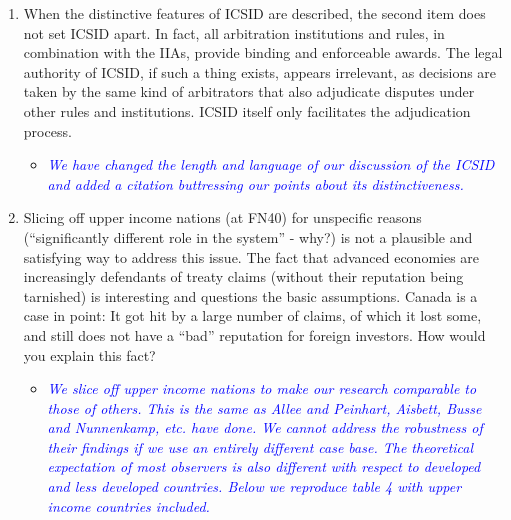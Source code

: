 \begin{enumerate}
	\item When the distinctive features of ICSID are described, the second item does not set ICSID apart. In fact, all arbitration institutions and rules, in combination with the IIAs, provide binding and enforceable awards. The legal authority of ICSID, if such a thing exists, appears irrelevant, as decisions are taken by the same kind of arbitrators that also adjudicate disputes under other rules and institutions. ICSID itself only facilitates the adjudication process. 
	\begin{itemize}
		\item \textcolor{blue}{ \emph{
		We have changed the length and language of our discussion of the ICSID and added a citation buttressing our points about its distinctiveness.
		}}
	\end{itemize}
	\clearpage
	\item Slicing off upper income nations (at FN40) for unspecific reasons (``significantly different role in the system'' - why?) is not a plausible and satisfying way to address this issue. The fact that advanced economies are increasingly defendants of treaty claims (without their reputation being tarnished) is interesting and questions the basic assumptions. Canada is a case in point: It got hit by a large number of claims, of which it lost some, and still does not have a ``bad'' reputation for foreign investors. How would you explain this fact?	
	\begin{itemize}
		\item \textcolor{blue}{ \emph{ 
		We slice off upper income nations to make our research comparable to those of others. This is the same as Allee and Peinhart, Aisbett, Busse and Nunnenkamp, etc. have done. We cannot address the robustness of their findings if we use an entirely different case base. The theoretical expectation of most observers is also different with respect to developed and less developed countries. Below we reproduce table 4 with upper income countries included.
		}}


\end{itemize}
\end{enumerate}
